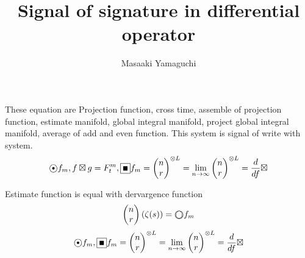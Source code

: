 \documentclass{jsarticle}
\begin{document}
\title{Signal of signature in differential operator}
\author{Masaaki Yamaguchi}
\date{}
\maketitle
  \newcommand{\whitewithbodercircle}
  {\text{\textcircled{\phantom{\textbullet}}}
  \kern-0.9em\text{\textcircled{\phantom{}}}}
 
  \newcommand{\whitewithblack}{\text{\textcircled{\textbullet}}}
  \newcommand{\whitewithblacksquare}{\text{\fbox{\text{\rule{0.5em}
  {0.5em}}}}}
  \newcommand{\whitewithwhitesquare}{\text{\fbox{\text{\phantom
  {\rule{0.5em}{0.5em}}}}}}

 These equation are Projection function, cross time, assemble of projection
 function, estimate manifold, global integral manifold, project global 
 integral manifold, average of add and even function.
 This system is signal of write with system.
  $$ \whitewithblack f_m , f \boxtimes g = F^{m}_t, 
  \whitewithblacksquare f_m = {\begin{pmatrix}
	  n \\
  r \end{pmatrix}}^{\otimes L} = \lim_{n \to \infty}
  {\begin{pmatrix}
	  n \\
  r \end{pmatrix}}^{\otimes L} = {d \over {d f}}\boxtimes $$

  \newcommand{\whitewithwhitecircle}
  {\text{\textcircled{\phantom{\textbullet}}}}
  Estimate function is equal with dervargence function
  $$ \begin{pmatrix}
	  n \\
  r \end{pmatrix}(\zeta(s)) = \whitewithbodercircle f_m $$
  $$ \whitewithblack f_m ,
  \whitewithblacksquare f_m = {\begin{pmatrix}
	  n \\
  r \end{pmatrix}}^{\otimes L} = \lim_{n \to \infty}
  {\begin{pmatrix}
	  n \\
  r \end{pmatrix}}^{\otimes L} = {d \over {d f}}\boxtimes $$


   \newcommand{\variint}{%
	\begin{picture}(15,30)
		\put(0,0){
			$ \iint $}
		\put(0,5){\line(15,0){15}}
	\end{picture} %
}
  \newcommand{\whitewithboder}{%
	  \begin{picture}(5,5)
		  \put(0,0){\scalebox{2.0}[2]{$\square$}}
		  \put(4,4){$\square$}
	  \end{picture}%
  } 
  \newcommand{\whitewithnabla}{%
	  \begin{picture}(4,4)
		  \put(0,0){\scalebox{2.0}[2]{$\nabla$}}
		  \put(3,3){$\nabla$}
	  \end{picture}%
  } 
  \newcommand{\average}{%
	  \begin{picture}(5,5)
		  \put(0,0){\scalebox{2.0}[2]{$\square$}}
		  \put(4,4){$\setminus$}
	  \end{picture}%
  } 
 
\end{document}
